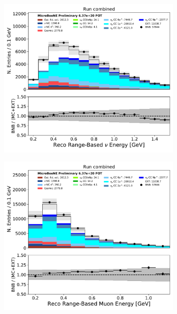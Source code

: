 \begin{figure}[hbt!] 
\begin{center}
    \begin{subfigure}[b]{0.3\textwidth}
    \centering
    \includegraphics[width=1.00\textwidth]{NuMuCCsel/Images/Ryan/combined/reco_nu_e_range_v_08052020_full_samples_longest_noCRT_event_category.pdf}
    \caption{\label{fig:NuMUCCsel:ryan:combinedkinematics:nuE}}
    \end{subfigure}
    \begin{subfigure}[b]{0.3\textwidth}
    \centering
    \includegraphics[width=1.00\textwidth]{NuMuCCsel/Images/Ryan/combined/trk_range_muon_e_v_08052020_full_samples_longest_noCRT_event_category.pdf}

\end{subfigure}
\end{center}
\end{figure}
